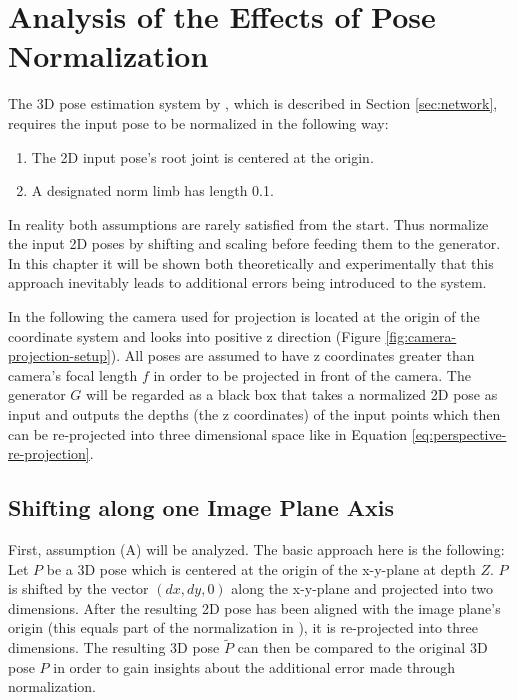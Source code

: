 \section{Analysis of the Effects of Pose Normalization}
\label{sec:effects-of-normalization}

The 3D pose estimation system by \citet{drover18}, which is described in Section \ref{sec:network}, requires the input pose to be normalized in the following way:
\begin{enumerate}[label=(\Alph*)]
	\item The 2D input pose's root joint is centered at the origin.
	\item A designated norm limb has length 0.1.
\end{enumerate}

In reality both assumptions are rarely satisfied from the start.
Thus \citet{drover18} normalize the input 2D poses by shifting and scaling before feeding them to the generator.
In this chapter it will be shown both theoretically and experimentally that this approach inevitably leads to additional errors being introduced to the system.

In the following the camera used for projection is located at the origin of the coordinate system and looks into positive z direction (Figure \ref{fig:camera-projection-setup}).
All poses are assumed to have z coordinates greater than camera's focal length $f$ in order to be projected in front of the camera.
The generator $G$ will be regarded as a black box that takes a normalized 2D pose as input and outputs the depths (the z coordinates) of the input points which then can be re-projected into three dimensional space like in Equation \eqref{eq:perspective-re-projection}.

\subsection{Shifting along one Image Plane Axis}
\label{sec:x-shift-error}
First, assumption (A) will be analyzed.
The basic approach here is the following:
Let $P$ be a 3D pose which is centered at the origin of the x-y-plane at depth $Z$.
$P$ is shifted by the vector $(dx, dy, 0)$ along the x-y-plane and projected into two dimensions.
After the resulting 2D pose has been aligned with the image plane's origin (this equals part of the normalization in \cite{drover18}), it is re-projected into three dimensions.
The resulting 3D pose $\widetilde{P}$ can then be compared to the original 3D pose $P$ in order to gain insights about the additional error made through normalization.

